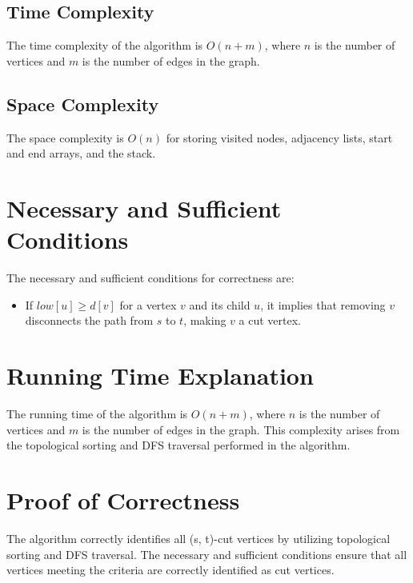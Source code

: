 \documentclass{article}
\begin{document}
    \subsection{Time Complexity}
        The time complexity of the algorithm is $O(n + m)$, where $n$ is the number of vertices and $m$ is the number of edges in the graph.
        
    \subsection{Space Complexity}
        The space complexity is $O(n)$ for storing visited nodes, adjacency lists, start and end arrays, and the stack.


\section{Necessary and Sufficient Conditions}
    The necessary and sufficient conditions for correctness are:
    \begin{itemize}
        \item If $low[u] \geq d[v]$ for a vertex $v$ and its child $u$, it implies that removing $v$ disconnects the path from $s$ to $t$, making $v$ a cut vertex.
    \end{itemize}


\section{Running Time Explanation}
    The running time of the algorithm is $O(n + m)$, where $n$ is the number of vertices and $m$ is the number of edges in the graph. This complexity arises from the topological sorting and DFS traversal performed in the algorithm.


\section{Proof of Correctness}
    The algorithm correctly identifies all (s, t)-cut vertices by utilizing topological sorting and DFS traversal. The necessary and sufficient conditions ensure that all vertices meeting the criteria are correctly identified as cut vertices.
\end{document}
